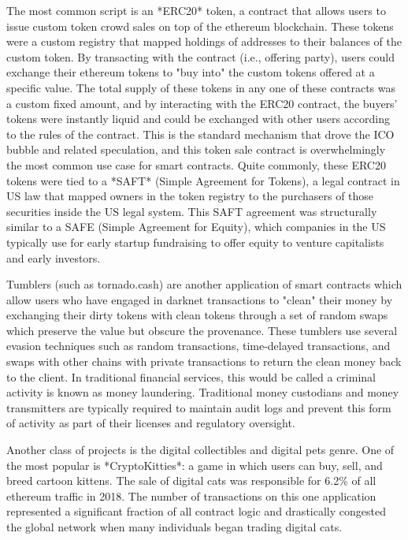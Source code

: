 
The most common script is an *ERC20* token, a contract that allows users to
issue custom token crowd sales on top of the ethereum blockchain. These tokens
were a custom registry that mapped holdings of addresses to their balances of
the custom token. By transacting with the contract (i.e., offering party), users
could exchange their ethereum tokens to "buy into" the custom tokens offered at
a specific value. The total supply of these tokens in any one of these contracts
was a custom fixed amount, and by interacting with the ERC20 contract, the
buyers' tokens were instantly liquid and could be exchanged with other users
according to the rules of the contract. This is the standard mechanism that
drove the ICO bubble and related speculation, and this token sale contract is
overwhelmingly the most common use case for smart contracts. Quite commonly,
these ERC20 tokens were tied to a *SAFT* (Simple Agreement for Tokens), a legal
contract in US law that mapped owners in the token registry to the purchasers of
those securities inside the US legal system. This SAFT agreement was
structurally similar to a SAFE (Simple Agreement for Equity), which companies in
the US typically use for early startup fundraising to offer equity to venture
capitalists and early investors.


Tumblers (such as tornado.cash) are another application of smart contracts which
allow users who have engaged in darknet transactions to "clean" their money by
exchanging their dirty tokens with clean tokens through a set of random swaps
which preserve the value but obscure the provenance. These tumblers use several
evasion techniques such as random transactions, time-delayed transactions, and
swaps with other chains with private transactions to return the clean money back
to the client. In traditional financial services, this would be called a
criminal activity is known as money laundering. Traditional money custodians and
money transmitters are typically required to maintain audit logs and prevent
this form of activity as part of their licenses and regulatory oversight.


Another class of projects is the digital collectibles and digital pets genre.
One of the most popular is *CryptoKitties*: a game in which users can buy, sell,
and breed cartoon kittens. The sale of digital cats was responsible for 6.2\% of
all ethereum traffic in 2018. The number of transactions on this one application
represented a significant fraction of all contract logic and drastically
congested the global network when many individuals began trading digital cats.

